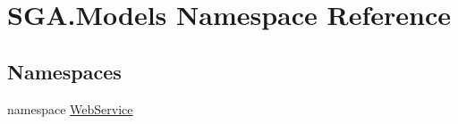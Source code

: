 \hypertarget{namespace_s_g_a_1_1_models}{}\section{S\+G\+A.\+Models Namespace Reference}
\label{namespace_s_g_a_1_1_models}
\subsection*{Namespaces}
\begin{DoxyCompactItemize}
\item 
namespace \hyperlink{namespace_s_g_a_1_1_models_1_1_web_service}{Web\+Service}
\end{DoxyCompactItemize}
